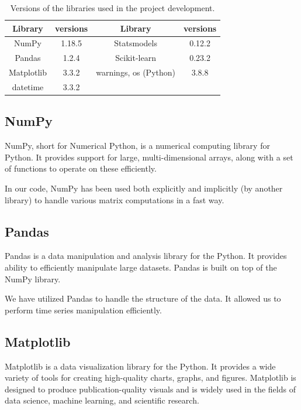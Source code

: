 \documentclass[12pt,a4paper]{article}
\begin{document}
\begin{table}[h!]
    \centering
    \begin{tabular}{|c|c|c|c|}
    \hline
        Library &  versions &  Library & versions  \\
        \hline
        NumPy & 1.18.5 & Statsmodels & 0.12.2 \\
        Pandas & 1.2.4  & Scikit-learn & 0.23.2 \\
        Matplotlib & 3.3.2 & warnings, os (Python) &  3.8.8 \\
        datetime & 3.3.2 &  &  \\
        \hline
    \end{tabular}
    \caption{Versions of the libraries used in the project development. }
    \label{tab:versions}
\end{table}

\subsection{NumPy \cite{harris2020array}}
NumPy, short for Numerical Python, is a numerical computing library for Python. It provides support for large, multi-dimensional arrays, along with a set of functions to operate on these efficiently. 

In our code, NumPy has been used both explicitly and implicitly (by another library) to handle various matrix computations in a fast way.

\subsection{Pandas \cite{reback2020pandas}}

Pandas is a data manipulation and analysis library for the Python. It provides ability to efficiently manipulate large datasets. Pandas is built on top of the NumPy library.

We have utilized Pandas to handle the structure of the data. It allowed us to perform time series manipulation efficiently.



\subsection{Matplotlib \cite{Hunter:2007}}
Matplotlib is a data visualization library for the Python. It provides a wide variety of tools for creating high-quality charts, graphs, and figures. Matplotlib is designed to produce publication-quality visuals and is widely used in the fields of data science, machine learning, and scientific research.
\end{document}
